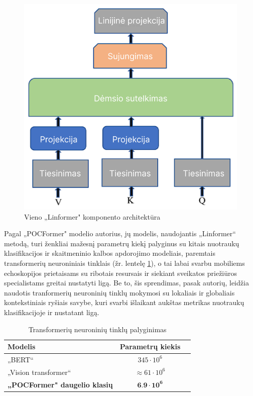 \documentclass[fleqn]{VUMIFKompMagistrinis}
\begin{document}
\begin{figure}[H]
    \centering
    \includegraphics[scale=0.40]{img/linformer.PNG}
    \caption{Vieno „Linformer" komponento architektūra \cite{PAY21}}
    \label{img:linformer}
\end{figure}

\par
Pagal „POCFormer" modelio autorius, jų modelis, naudojantis „Linformer“ metodą, turi ženkliai mažesnį parametrų kiekį palyginus su kitais nuotraukų klasifikacijos ir skaitmeninio kalbos apdorojimo modeliais, paremtais transformerių neuroniniais tinklais (žr. lentelę \ref{tab:parametrai1}), o tai labai svarbu mobiliems echoskopijos prietaisams su ribotais resursais ir siekiant sveikatos priežiūros specialistams greitai nustatyti ligą. Be to, šis sprendimas, pasak autorių, leidžia naudotis tranformerių neuroninių tinklų mokymosi su lokaliais ir globaliais kontekstiniais ryšiais savybe, kuri svarbi išlaikant aukštas metrikas nuotraukų klasifikacijoje ir nustatant ligą. \cite{PAY21}

\begin{table}[H]\footnotesize
  \centering
  \caption{Transformerių neuroninių tinklų palyginimas \cite{PAY21, dosovitskiy2021image}}
  \begin{tabular}{|l|c|c|} \hline
    Modelis    & Parametrų kiekis \\
    \hline
    „BERT“ & \( 345 \cdot 10^6 \) \\
    „Vision transformer“ & \( \approx61 \cdot 10^6 \) \\
    \textbf{„POCFormer" daugelio klasių}  & \( \textbf{6.9} \cdot \textbf{10} ^ \textbf{6} \) \\
    \hline
  \end{tabular}
  \label{tab:parametrai1}
\end{table}
\end{document}
